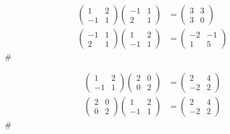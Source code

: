 \begin{example}\label{ex:b6s-1-34}
\begin{align*}
\begin{pmatrix} 1 & 2 \\ -1 & 1 \end{pmatrix} \begin{pmatrix} -1 & 1 \\ 2 & 1 \end{pmatrix} &= \begin{pmatrix} 3 & 3 \\ 3 & 0 \end{pmatrix} \\
\begin{pmatrix} -1 & 1 \\ 2 & 1 \end{pmatrix} \begin{pmatrix} 1 & 2 \\ -1 & 1 \end{pmatrix} &= \begin{pmatrix} -2 & -1 \\ 1 & 5 \end{pmatrix}
\end{align*}\hfill$\#$
\end{example}

\begin{example}\label{ex:b6s-1-35}
\begin{align*}
\begin{pmatrix} 1 & 2 \\ -1 & 1 \end{pmatrix} \begin{pmatrix} 2 & 0 \\ 0 & 2 \end{pmatrix} &= \begin{pmatrix} 2 & 4 \\ -2 & 2 \end{pmatrix} \\
\begin{pmatrix} 2 & 0 \\ 0 & 2 \end{pmatrix} \begin{pmatrix} 1 & 2 \\ -1 & 1 \end{pmatrix} &= \begin{pmatrix} 2 & 4 \\ -2 & 2 \end{pmatrix}
\end{align*}\hfill$\#$
\end{example}


